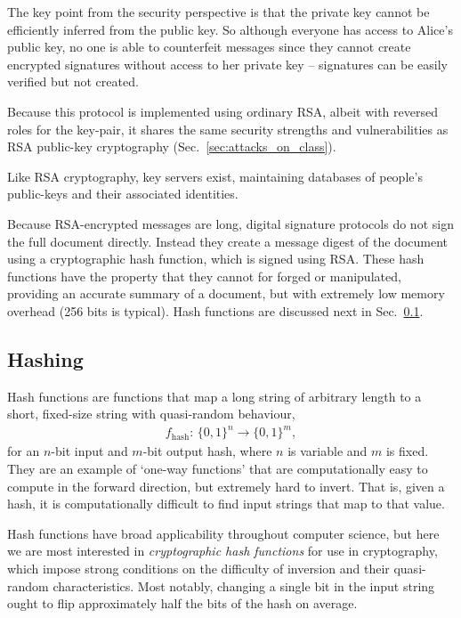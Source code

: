 The key point from the security perspective is that the private key cannot be efficiently inferred from the public key. So although everyone has access to Alice's public key, no one is able to counterfeit messages since they cannot create encrypted signatures without access to her private key -- signatures can be easily verified but not created.

Because this protocol is implemented using ordinary RSA, albeit with reversed roles for the key-pair, it shares the same security strengths and vulnerabilities as RSA public-key cryptography (Sec.~\ref{sec:attacks_on_class}).

Like RSA cryptography, key servers exist, maintaining databases of people's public-keys and their associated identities.

Because RSA-encrypted messages are long, digital signature protocols do not sign the full document directly. Instead they create a message digest of the document using a cryptographic hash function, which is signed using RSA. These hash functions have the property that they cannot for forged or manipulated, providing an accurate summary of a document, but with extremely low memory overhead (256 bits is typical). Hash functions are discussed next in Sec.~\ref{sec:hashing}.

%
%

\subsection{Hashing} \label{sec:hashing} 

Hash functions are functions that map a long string of arbitrary length to a short, fixed-size string with quasi-random behaviour,
\begin{align}
	f_\mathrm{hash}:\,\{0,1\}^n \to \{0,1\}^m,
\end{align}
for an $n$-bit input and $m$-bit output hash, where $n$ is variable and $m$ is fixed. They are an example of `one-way functions' that are computationally easy to compute in the forward direction, but extremely hard to invert. That is, given a hash, it is computationally difficult to find input strings that map to that value.

Hash functions have broad applicability throughout computer science, but here we are most interested in \textit{cryptographic hash functions} for use in cryptography, which impose strong conditions on the difficulty of inversion and their quasi-random characteristics. Most notably, changing a single bit in the input string ought to flip approximately half the bits of the hash on average.


